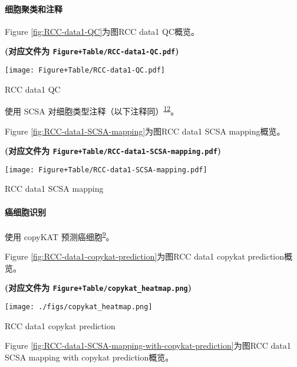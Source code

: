 \documentclass[
]{article}
\begin{document}
\hypertarget{ux7ec6ux80deux805aux7c7bux548cux6ce8ux91ca}{%
\paragraph{细胞聚类和注释}\label{ux7ec6ux80deux805aux7c7bux548cux6ce8ux91ca}}

Figure \ref{fig:RCC-data1-QC}为图RCC data1 QC概览。

\textbf{(对应文件为 \texttt{Figure+Table/RCC-data1-QC.pdf})}

\def\@captype{figure}
\begin{center}
\texttt{[image: Figure+Table/RCC-data1-QC.pdf]}
\caption{RCC data1 QC}\label{fig:RCC-data1-QC}
\end{center}

使用 SCSA 对细胞类型注释（以下注释同）\textsuperscript{\protect\hyperlink{ref-ScsaACellTyCaoY2020}{12}}。

Figure \ref{fig:RCC-data1-SCSA-mapping}为图RCC data1 SCSA mapping概览。

\textbf{(对应文件为 \texttt{Figure+Table/RCC-data1-SCSA-mapping.pdf})}

\def\@captype{figure}
\begin{center}
\texttt{[image: Figure+Table/RCC-data1-SCSA-mapping.pdf]}
\caption{RCC data1 SCSA mapping}\label{fig:RCC-data1-SCSA-mapping}
\end{center}

\hypertarget{ux764cux7ec6ux80deux8bc6ux522b}{%
\paragraph{癌细胞识别}\label{ux764cux7ec6ux80deux8bc6ux522b}}

使用 copyKAT 预测癌细胞\textsuperscript{\protect\hyperlink{ref-DelineatingCopGaoR2021}{9}}。

Figure \ref{fig:RCC-data1-copykat-prediction}为图RCC data1 copykat prediction概览。

\textbf{(对应文件为 \texttt{Figure+Table/copykat\_heatmap.png})}

\def\@captype{figure}
\begin{center}
\texttt{[image: ./figs/copykat\_heatmap.png]}
\caption{RCC data1 copykat prediction}\label{fig:RCC-data1-copykat-prediction}
\end{center}

Figure \ref{fig:RCC-data1-SCSA-mapping-with-copykat-prediction}为图RCC data1 SCSA mapping with copykat prediction概览。
\end{document}
